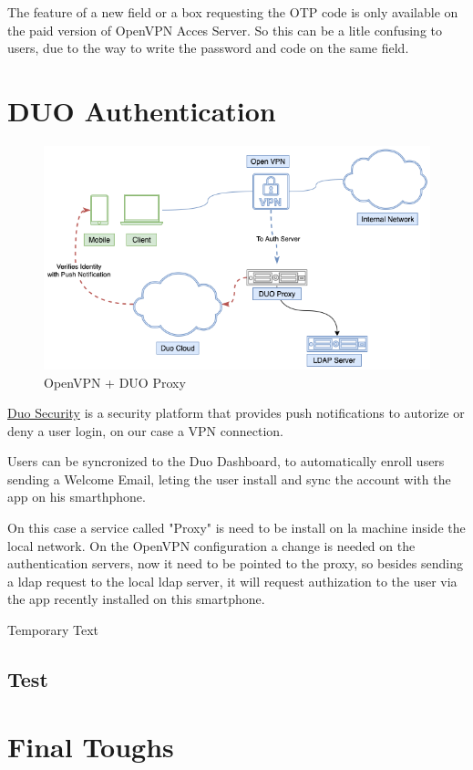 The feature of a new field or a box requesting the OTP code is only available on the paid version of OpenVPN Acces Server.
So this can be a litle confusing to users, due to the way to write the password and code on the same field.




\newpage
\section{DUO Authentication}

\begin{figure}
  \centering
  \includegraphics[width=160mm]{images/duoOVPN.png}
  \caption{OpenVPN + DUO Proxy}
  \label{fig:label}
\end{figure}

\href{https://duo.com/}{Duo Security} is a security platform that provides push notifications to autorize or deny a user login, on our case a VPN connection.

Users can be syncronized to the Duo Dashboard, to automatically enroll users sending a Welcome Email, leting the user install and sync the account with the app on his smarthphone.

On this case a service called "Proxy" is need to be install on la machine inside the local network. On the OpenVPN configuration a change is needed on the authentication servers, now it need to be pointed to the proxy, so besides sending a ldap request to the local ldap server, it will request authization to the user via the app recently installed on this smartphone.

Temporary Text



\subsection{Test}


\newpage
\section{Final Toughs}
